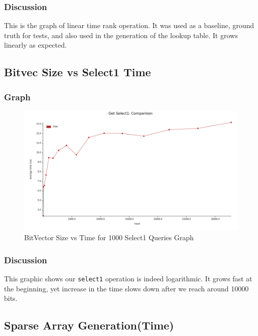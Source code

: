 \documentclass{report}
\begin{document}
\subsubsection*{Discussion}
This is the graph of linear time rank operation. It was used as a baseline, ground truth for tests, and also used in the generation of the lookup table. It grows linearly as expected. 
\newpage


\subsection*{Bitvec Size vs Select1 Time}
\subsubsection*{Graph}
\begin{figure}[h!]
    \centering
    \includegraphics[scale=0.5]{get_select1_time.png}
    \caption{BitVector Size vs Time for 1000 Select1 Queries Graph}
    \label{fig:my_label}
\end{figure}
\subsubsection*{Discussion}
This graphic shows our \texttt{select1} operation is indeed logarithmic. It grows fast at the beginning, yet increase in the time slows down after we reach around 10000 bits. 
\newpage

\subsection*{Sparse Array Generation(Time)}
\end{document}
